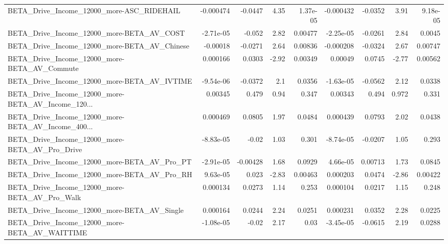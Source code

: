 \begin{tabular}{lrrrrrrrr}
BETA\_Drive\_Income\_12000\_more-ASC\_RIDEHAIL          &   -0.000474 &      -0.0447 &      4.35 & 1.37e-05 &  -0.000432 &     -0.0352 &         3.91 &      9.18e-05 \\
BETA\_Drive\_Income\_12000\_more-BETA\_AV\_COST          &   -2.71e-05 &       -0.052 &      2.82 &  0.00477 &  -2.25e-05 &     -0.0261 &         2.84 &        0.0045 \\
BETA\_Drive\_Income\_12000\_more-BETA\_AV\_Chinese       &    -0.00018 &      -0.0271 &      2.64 &  0.00836 &  -0.000208 &     -0.0324 &         2.67 &       0.00747 \\
BETA\_Drive\_Income\_12000\_more-BETA\_AV\_Commute       &    0.000166 &       0.0303 &     -2.92 &  0.00349 &    0.00049 &      0.0745 &        -2.77 &       0.00562 \\
BETA\_Drive\_Income\_12000\_more-BETA\_AV\_IVTIME        &   -9.54e-06 &      -0.0372 &       2.1 &   0.0356 &  -1.63e-05 &     -0.0562 &         2.12 &        0.0338 \\
BETA\_Drive\_Income\_12000\_more-BETA\_AV\_Income\_120... &     0.00345 &        0.479 &      0.94 &    0.347 &    0.00343 &       0.494 &        0.972 &         0.331 \\
BETA\_Drive\_Income\_12000\_more-BETA\_AV\_Income\_400... &    0.000469 &       0.0805 &      1.97 &   0.0484 &   0.000439 &      0.0793 &         2.02 &        0.0438 \\
BETA\_Drive\_Income\_12000\_more-BETA\_AV\_Pro\_Drive     &   -8.83e-05 &        -0.02 &      1.03 &    0.301 &  -8.74e-05 &     -0.0207 &         1.05 &         0.293 \\
BETA\_Drive\_Income\_12000\_more-BETA\_AV\_Pro\_PT        &   -2.91e-05 &     -0.00428 &      1.68 &   0.0929 &   4.66e-05 &     0.00713 &         1.73 &        0.0845 \\
BETA\_Drive\_Income\_12000\_more-BETA\_AV\_Pro\_RH        &    9.63e-05 &        0.023 &     -2.83 &  0.00463 &   0.000203 &      0.0474 &        -2.86 &       0.00422 \\
BETA\_Drive\_Income\_12000\_more-BETA\_AV\_Pro\_Walk      &    0.000134 &       0.0273 &      1.14 &    0.253 &   0.000104 &      0.0217 &         1.15 &         0.248 \\
BETA\_Drive\_Income\_12000\_more-BETA\_AV\_Single        &    0.000164 &       0.0244 &      2.24 &   0.0251 &   0.000231 &      0.0352 &         2.28 &        0.0225 \\
BETA\_Drive\_Income\_12000\_more-BETA\_AV\_WAITTIME      &   -1.08e-05 &        -0.02 &      2.17 &     0.03 &  -3.45e-05 &     -0.0615 &         2.19 &        0.0288 \\

\end{tabular}
